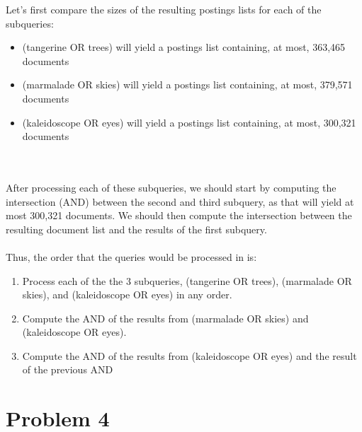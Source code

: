 \documentclass{article}%
\begin{document}
Let's first compare the sizes of the resulting postings lists for each of the subqueries:
\begin{itemize}
    \item (tangerine OR trees) will yield a postings list containing, at most, 363,465 documents
    \item (marmalade OR skies) will yield a postings list containing, at most, 379,571 documents
    \item (kaleidoscope OR eyes) will yield a postings list containing, at most, 300,321 documents
\end{itemize}\\
\\
After processing each of these subqueries, we should start by computing the intersection (AND) between the second and third subquery, as that will yield at most 300,321 documents. We should then compute the intersection between the resulting document list and the results of the first subquery.\\
\\
Thus, the order that the queries would be processed in is:
\begin{enumerate}
    \item Process each of the the 3 subqueries, (tangerine OR trees), (marmalade OR skies), and (kaleidoscope OR eyes) in any order.
    \item Compute the AND of the results from (marmalade OR skies) and (kaleidoscope OR eyes).
    \item Compute the AND of the results from (kaleidoscope OR eyes) and the result of the previous AND
\end{enumerate}
\section*{Problem 4}
\end{document}
